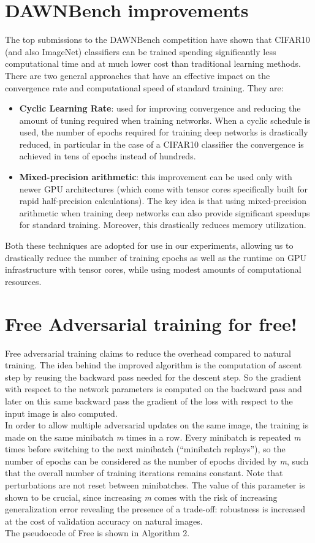 \documentclass{article}
\begin{document}
\section{DAWNBench improvements}
The top submissions to the DAWNBench competition have shown that CIFAR10 (and
also ImageNet) classifiers can be trained spending significantly less
computational time and at much lower cost than traditional learning methods.
There are two general approaches that have an effective impact on the
convergence rate and computational speed of standard training. They are:
\begin{itemize}
	\item \textbf{Cyclic Learning Rate}: used for improving convergence and reducing
	the amount of tuning required when training networks. When a cyclic schedule is
	used, the number of epochs required for training deep networks is drastically
	reduced, in particular in the case of a CIFAR10 classifier the convergence is
	achieved in tens of epochs instead of hundreds.
	\item \textbf{Mixed-precision arithmetic}: this improvement can be used only
	with newer GPU architectures (which come with tensor cores specifically built
	for rapid half-precision calculations). The key idea is that using
	mixed-precision arithmetic when training deep networks can also provide
	significant speedups for standard training. Moreover, this drastically reduces
	memory utilization.
\end{itemize}
Both these techniques are adopted for use in our
experiments, allowing us to drastically reduce the number of training epochs as
well as the runtime on GPU  infrastructure with tensor cores, while using modest
amounts of computational resources. 

\section{Free Adversarial training for free!}

Free adversarial training \cite{ShafahiEtAl2019b} claims to reduce the overhead
compared to natural training. The idea behind the improved algorithm is the
computation of ascent step by reusing the backward pass needed for the descent
step. So the gradient with respect to the network parameters is computed on the
backward pass and later on this same backward pass the gradient of the loss with
respect to the input image is also computed.\\
In order to allow multiple adversarial updates on the same image, the training is
made on the same minibatch \textit{m} times in a row. Every minibatch is
repeated \textit{m} times before switching to the next minibatch (“minibatch replays”),
so the number of epochs can be considered as the number of epochs divided by \textit{m},
such that the overall number of training iterations remains constant. Note that
perturbations are not reset between minibatches. The value of this parameter is
shown to be crucial, since increasing \textit{m} comes with the risk of increasing
generalization error revealing  the presence of a trade-off: robustness is
increased at the cost of validation accuracy on natural images.\\
The pseudocode of Free is shown in Algorithm 2.
\end{document}
